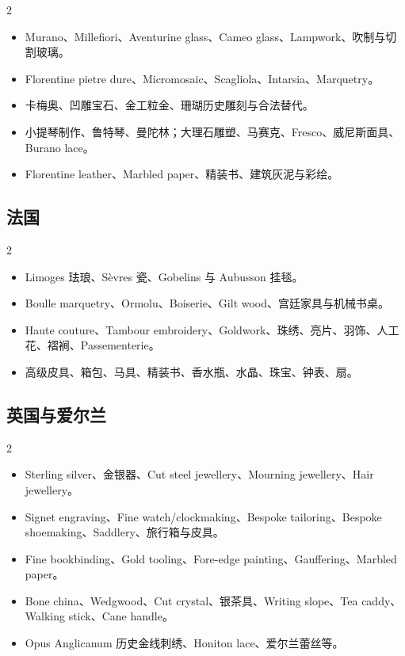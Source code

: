 \documentclass[lang=en,a4paper,11pt]{elegantpaper}
\begin{document}
\begin{multicols}{2}
\begin{itemize}
\item Murano、Millefiori、Aventurine glass、Cameo glass、Lampwork、吹制与切割玻璃。
\item Florentine pietre dure、Micromosaic、Scagliola、Intarsia、Marquetry。
\item 卡梅奥、凹雕宝石、金工粒金、珊瑚历史雕刻与合法替代。
\item 小提琴制作、鲁特琴、曼陀林；大理石雕塑、马赛克、Fresco、威尼斯面具、Burano lace。
\item Florentine leather、Marbled paper、精装书、建筑灰泥与彩绘。
\end{itemize}
\end{multicols}

\subsection{法国}


\begin{multicols}{2}
\begin{itemize}
\item Limoges 珐琅、Sèvres 瓷、Gobelins 与 Aubusson 挂毯。
\item Boulle marquetry、Ormolu、Boiserie、Gilt wood、宫廷家具与机械书桌。
\item Haute couture、Tambour embroidery、Goldwork、珠绣、亮片、羽饰、人工花、褶裥、Passementerie。
\item 高级皮具、箱包、马具、精装书、香水瓶、水晶、珠宝、钟表、扇。
\end{itemize}
\end{multicols}

\subsection{英国与爱尔兰}


\begin{multicols}{2}
\begin{itemize}
\item Sterling silver、金银器、Cut steel jewellery、Mourning jewellery、Hair jewellery。
\item Signet engraving、Fine watch/clockmaking、Bespoke tailoring、Bespoke shoemaking、Saddlery、旅行箱与皮具。
\item Fine bookbinding、Gold tooling、Fore-edge painting、Gauffering、Marbled paper。
\item Bone china、Wedgwood、Cut crystal、银茶具、Writing slope、Tea caddy、Walking stick、Cane handle。
\item Opus Anglicanum 历史金线刺绣、Honiton lace、爱尔兰蕾丝等。
\end{itemize}
\end{multicols}
\end{document}
